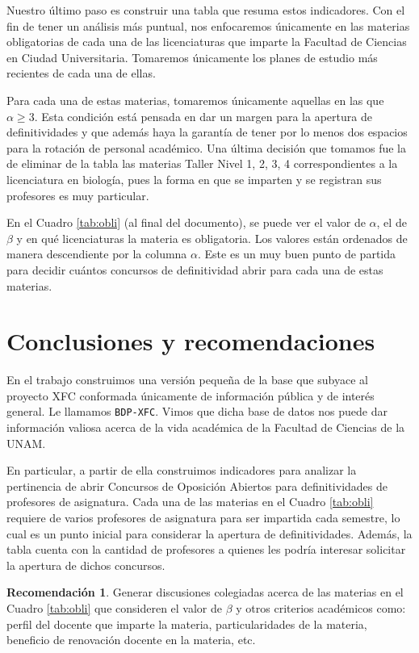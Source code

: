 \documentclass[twocolumn]{article}
\theoremstyle{definition}
\newtheorem{recomendacion}{Recomendación}
\begin{document}
Nuestro último paso es construir una tabla que resuma estos indicadores. Con el fin de tener un análisis más puntual, nos enfocaremos únicamente en las materias obligatorias de cada una de las licenciaturas que imparte la Facultad de Ciencias en Ciudad Universitaria. Tomaremos únicamente los planes de estudio más recientes de cada una de ellas.

Para cada una de estas materias, tomaremos únicamente aquellas en las que $\alpha\geq 3$. Esta condición está pensada en dar un margen para la apertura de definitividades y que además haya la garantía de tener por lo menos dos espacios para la rotación de personal académico. Una última decisión que tomamos fue la de eliminar de la tabla las materias Taller Nivel 1, 2, 3, 4 correspondientes a la licenciatura en biología, pues la forma en que se imparten y se registran sus profesores es muy particular.

En el Cuadro \ref{tab:obli} (al final del documento), se puede ver el valor de $\alpha$, el de $\beta$ y en qué licenciaturas la materia es obligatoria. Los valores están ordenados de manera descendiente por la columna $\alpha$. Este es un muy buen punto de partida para decidir cuántos concursos de definitividad abrir para cada una de estas materias.

\section{Conclusiones y recomendaciones}

En el trabajo construimos una versión pequeña de la base que subyace al proyecto XFC conformada únicamente de información pública y de interés general. Le llamamos \texttt{BDP-XFC}. Vimos que dicha base de datos nos puede dar información valiosa acerca de la vida académica de la Facultad de Ciencias de la UNAM.

En particular, a partir de ella construimos indicadores para analizar la pertinencia de abrir Concursos de Oposición Abiertos para definitividades de profesores de asignatura. Cada una de las materias en el Cuadro \ref{tab:obli} requiere de varios profesores de asignatura para ser impartida cada semestre, lo cual es un punto inicial para considerar la apertura de definitividades. Además, la tabla cuenta con la cantidad de profesores a quienes les podría interesar solicitar la apertura de dichos concursos.

\begin{recomendacion}

Generar discusiones colegiadas acerca de las materias en el Cuadro \ref{tab:obli} que consideren el valor de $\beta$ y otros criterios académicos como: perfil del docente que imparte la materia, particularidades de la materia, beneficio de renovación docente en la materia, etc.

\end{recomendacion}
\end{document}

